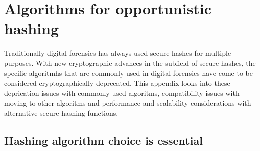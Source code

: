 \chapter{Algorithms for opportunistic hashing}
Traditionally digital forensics has always used secure hashes for multiple purposes. With new cryptographic advances in the subfield of secure hashes, the specific algoritmhs that are commonly used in digital forensics have come to be considered cryptographically deprecated. This appendix looks into these deprication issues with commonly used algoritms, compatibility issues with moving to other algoritms and performance and scalability considerations with alternative secure hashing functions.

\section{Hashing algorithm choice is essential} 
